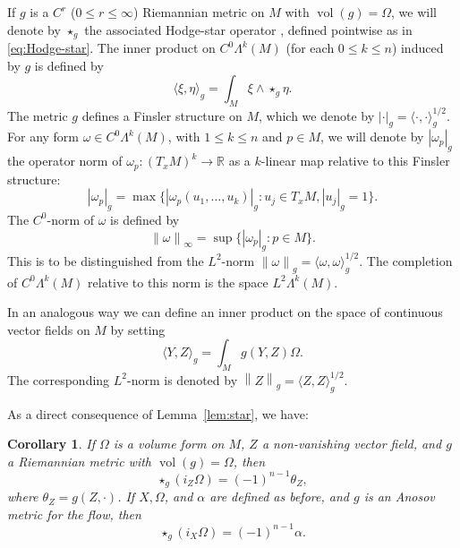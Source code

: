 \documentclass[11pt,letterpaper,reqno,abstract=true]{scrartcl}
\theoremstyle{plain}                              %
\newtheorem{cor}[thm]{Corollary}
\theoremstyle{definition}                         %
\theoremstyle{remark}                             %
\newcommand{\R}{\mathbb{R}}                     %
\DeclareMathOperator{\vol}{vol}
\providecommand{\norm}[1]{\left\lVert#1\right\rVert}       %
\providecommand{\abs}[1]{\left\lvert#1\right\rvert}        %
\begin{document}
  If $g$ is a $C^r$ ($0 \leq r \leq \infty$) Riemannian metric on $M$
  with $\vol(g) = \Omega$, we will denote by $\star_g$ the associated
  Hodge-star operator \cite{lee+smooth+13,warner+83}, defined
  pointwise as in \eqref{eq:Hodge-star}.  The inner product on
  $C^0 \Lambda^k(M)$ (for each $0 \leq k \leq n$) induced by $g$
  is defined by
%
  \begin{displaymath}
    \langle \xi,\eta \rangle_g = \int_M \xi \wedge \star_g \eta.
  \end{displaymath}
  The metric $g$ defines a Finsler structure on $M$, which we denote
  by $\abs{\cdot}_g = \langle \cdot, \cdot \rangle_g^{1/2}$. For any
  form $\omega \in C^0 \Lambda^k(M)$, with $1 \leq k \leq n$ and
  $p \in M$, we will denote by $\abs{\omega_p}_g$ the operator norm of
  $\omega_p : (T_x M)^k \to \R$ as a $k$-linear map relative to this
  Finsler structure:
%
\begin{displaymath}
  \abs{\omega_p}_g = \max \{ \abs{\omega_p(u_1,\ldots,u_k)}_g : u_j \in T_x M,
  \abs{u_j}_g = 1 \}.
\end{displaymath}
%
The $C^0$-norm of $\omega$ is defined by
%
\begin{displaymath}
  \norm{\omega}_\infty = \sup \{ \abs{\omega_p}_g : p \in M \}.
\end{displaymath}
%
This is to be distinguished from the $L^2$-norm
$\norm{\omega}_g = \langle \omega, \omega \rangle_g^{1/2}$. The
completion of $C^0 \Lambda^k(M)$ relative to this norm is the space
$L^2 \Lambda^k(M)$.

In an analogous way we can define an inner product on the space of
continuous vector fields on $M$ by setting
%
\begin{displaymath}
  \langle Y, Z \rangle_g = \int_M g(Y,Z) \Omega.
\end{displaymath}
%
The corresponding $L^2$-norm is denoted by $\norm{Z}_g = \langle
Z, Z \rangle_g^{1/2}$.

As a direct consequence of Lemma~\ref{lem:star}, we have:

    \begin{cor}  \label{cor:dual_form}
    If $\Omega$ is a volume form on $M$, $Z$ a non-vanishing vector
    field, and $g$ a Riemannian metric with $\vol(g) = \Omega$, then 
%
    \begin{displaymath}
      \star_g (i_Z \Omega) = (-1)^{n-1} \theta_Z,
    \end{displaymath}
%
    where $\theta_Z = g(Z,\cdot)$. If $X, \Omega$, and $\alpha$ are
    defined as before, and $g$ is an Anosov metric for the flow, then
    \begin{displaymath}
      \star_g (i_X \Omega) = (-1)^{n-1} \alpha.
    \end{displaymath}
%
  \end{cor}
\end{document}
